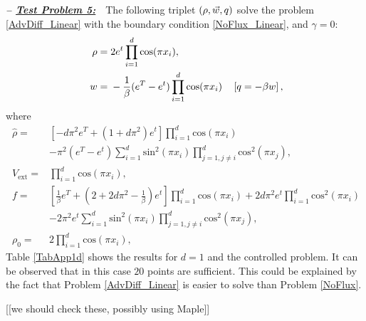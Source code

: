 \textbf{\emph{-- \underline{Test Problem 5:}}}~~The following triplet $(\rho,\vec{w},q)$ solve the problem \eqref{AdvDiff_Linear} with the boundary condition \eqref{NoFlux_Linear}, and $\gamma =0$:
\begin{align*}
\ \rho={}&2e^{t}\prod_{i=1}^{d}\text{cos}(\pi{}x_i), \\
\ w={}&-\frac{1}{\beta}(e^{T}-e^{t})\prod_{i=1}^{d}\text{cos}(\pi{}x_i)\quad\left[\adj=-\beta{}w\right],
\end{align*}
where
\begin{align*}
\ \widehat{\rho}={}&\left[-d\pi^2{}e^{T}+(1+d\pi^2)e^{t}\right]\prod_{i=1}^{d}\text{cos}(\pi{}x_i) \\
\ &-\pi^{2}(e^{T}-e^{t})\sum_{i=1}^{d}\text{sin}^2(\pi{}x_i)\prod_{j=1,j\neq{}i}^{d}\text{cos}^2(\pi{}x_j), \\
\ V_{\text{ext}}={}&\prod_{i=1}^{d}\text{cos}(\pi{}x_i), \\
\ f={}&\left[\frac{1}{\beta}e^{T}+\left(2+2d\pi^2-\frac{1}{\beta}\right)e^{t}\right]\prod_{i=1}^{d}\text{cos}(\pi{}x_i)+2d\pi^{2}e^{t}\prod_{i=1}^{d}\text{cos}^2\left(\pi{}x_i\right) \\
\ &-2\pi^{2}e^{t}\sum_{i=1}^{d}\text{sin}^2(\pi{}x_i)\prod_{j=1,j\neq{}i}^{d}\text{cos}^2(\pi{}x_j), \\
\ \rho_{0}={}&2\prod_{i=1}^{d}\text{cos}(\pi{}x_i),
\end{align*}
Table \ref{TabApp1d} shows the results for $d=1$ and the controlled problem. It can be observed that in this case $20$ points are sufficient. This could be explained by the fact that Problem \eqref{AdvDiff_Linear} is easier to solve than Problem \eqref{NoFlux}.



[[we should check these, possibly using Maple]]


